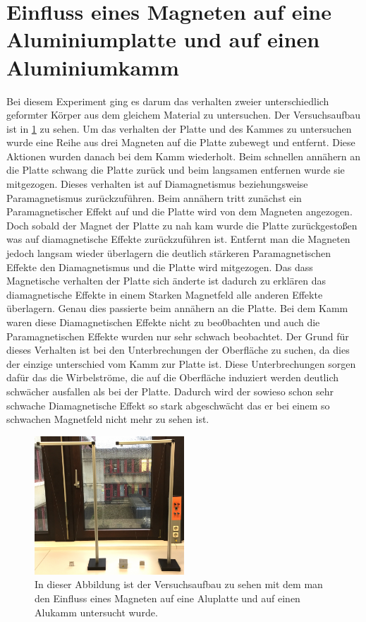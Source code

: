 \section[Magnetisches Verhalten von Aluminium]{Einfluss eines Magneten auf eine Aluminiumplatte und auf einen Aluminiumkamm }\label{kap:Kamm_Platte}
Bei diesem Experiment ging es darum das verhalten zweier unterschiedlich geformter Körper aus dem gleichem Material zu untersuchen. Der Versuchsaufbau ist in \cref{fig:Alukamm} zu sehen.
Um das verhalten der Platte und des Kammes zu untersuchen wurde eine Reihe aus drei Magneten  auf die Platte zubewegt und entfernt. Diese Aktionen wurden danach bei dem Kamm wiederholt.
Beim schnellen annähern an die Platte schwang die Platte zurück und beim langsamen entfernen wurde sie mitgezogen.
Dieses verhalten ist auf Diamagnetismus beziehungsweise Paramagnetismus zurückzuführen. Beim annähern tritt zunächst ein Paramagnetischer Effekt auf und die Platte wird von dem Magneten angezogen. Doch sobald der Magnet der Platte zu nah kam wurde die Platte zurückgestoßen was auf diamagnetische Effekte zurückzuführen ist. Entfernt man die Magneten jedoch langsam wieder überlagern die deutlich stärkeren Paramagnetischen Effekte den Diamagnetismus und die Platte wird mitgezogen.
Das dass Magnetische verhalten der Platte sich änderte ist dadurch zu erklären das diamagnetische Effekte in einem Starken Magnetfeld alle anderen Effekte überlagern. Genau dies passierte beim annähern an die Platte.
Bei dem Kamm waren diese Diamagnetischen Effekte nicht zu beo0bachten und auch die Paramagnetischen Effekte wurden nur sehr schwach beobachtet. Der Grund für dieses Verhalten ist bei den Unterbrechungen der Oberfläche zu  suchen, da dies der einzige unterschied vom Kamm zur Platte ist. Diese Unterbrechungen sorgen dafür das die Wirbelströme, die auf die Oberfläche induziert werden deutlich schwächer ausfallen als bei der Platte.
Dadurch wird der sowieso schon sehr schwache Diamagnetische Effekt so stark abgeschwächt das er bei einem so schwachen Magnetfeld nicht mehr zu sehen ist.
\begin{figure}[h]
	\includegraphics[width=0.5\textwidth]{res/Alupendel.png}
	\caption{In dieser Abbildung ist der Versuchsaufbau zu sehen mit dem man den Einfluss eines Magneten auf eine Aluplatte und auf einen Alukamm untersucht wurde\protect\footnotemark.}
	\label{fig:Alukamm}
\end{figure}
